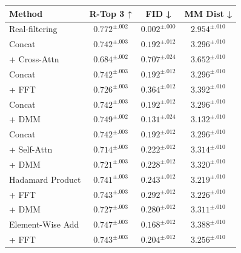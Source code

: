 \documentclass[a4paper,12pt]{article}
\begin{document}
\begin{table}[t]
\centering
\scriptsize
\setlength{\tabcolsep}{4pt}  %
\renewcommand{\arraystretch}{0.6}
\begin{tabular}{l|c|c|c}
\toprule
\textbf{Method} & \textbf{R-Top 3 ↑} & \textbf{FID ↓} & \textbf{MM Dist ↓} \\
\midrule
Real-filtering    & $0.772^{\pm.002}$ & $0.002^{\pm.000}$ & $2.954^{\pm.010}$ \\ \midrule
Concat      & $0.742^{\pm.003}$ & $0.192^{\pm.012}$ & $3.296^{\pm.010}$ \\
\hspace*{1em} + Cross-Attn   & $0.684^{\pm.002}$ & $0.707^{\pm.024}$ & $3.652^{\pm.010}$ \\ \midrule
Concat       & $0.742^{\pm.003}$ & $0.192^{\pm.012}$ & $3.296^{\pm.010}$ \\
\hspace*{1em} + FFT         & $0.726^{\pm.003}$ & $0.364^{\pm.012}$ & $3.392^{\pm.010}$ \\ \midrule
Concat       & $0.742^{\pm.003}$ & $0.192^{\pm.012}$ & $3.296^{\pm.010}$ \\
\hspace*{1em} + DMM   & $0.749^{\pm.002}$ & $0.131^{\pm.024}$ & $3.132^{\pm.010}$ \\ \midrule
Concat      & $0.742^{\pm.003}$ & $0.192^{\pm.012}$ & $3.296^{\pm.010}$ \\
\hspace*{1em} + Self-Attn    & $0.714^{\pm.003}$ & $0.222^{\pm.012}$ & $3.314^{\pm.010}$ \\ 
\hspace*{2em} + DMM      & $0.721^{\pm.003}$ & $0.228^{\pm.012}$ & $3.320^{\pm.010}$ \\ \midrule
Hadamard Product           & $0.741^{\pm.003}$ & $0.243^{\pm.012}$ & $3.219^{\pm.010}$ \\
\hspace*{1em} + FFT         & $0.743^{\pm.003}$ & $0.292^{\pm.012}$ & $3.226^{\pm.010}$ \\
\hspace*{2em} + DMM      & $0.727^{\pm.003}$ & $0.280^{\pm.012}$ & $3.311^{\pm.010}$ \\  \midrule
Element-Wise Add       & $0.747^{\pm.003}$ & $0.168^{\pm.012}$ & $3.388^{\pm.010}$ \\
\hspace*{1em} + FFT         & $0.743^{\pm.003}$ & $0.204^{\pm.012}$ & $3.256^{\pm.010}$ \\ \midrule

\end{tabular}
\end{table}
\end{document}
